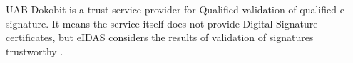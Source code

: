 UAB Dokobit is a trust service provider for Qualified validation of qualified e-signature. It means the service itself does not provide Digital Signature certificates, but eIDAS considers the results of validation of signatures trustworthy \cite{eu-trustservices}.












